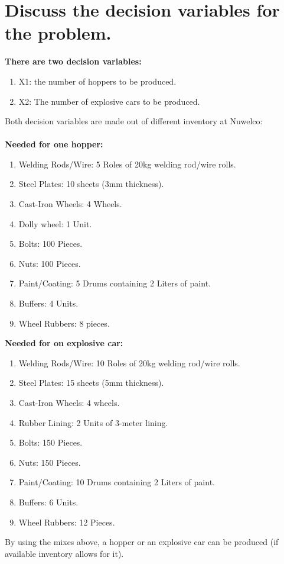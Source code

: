 \documentclass[a4paper,oneside,11pt]{book}
\begin{document}
\section{Discuss the decision variables for the problem.}
\textbf{There are two decision variables:}
\begin{enumerate}
    \item X1: the number of hoppers to be produced.
    \item X2: The number of explosive cars to be produced.
\end{enumerate}
Both decision variables are made out of different inventory at Nuwelco: \\\\
\textbf{Needed for one hopper:}
\begin{enumerate}
    \item Welding Rods/Wire: 5 Roles of 20kg welding rod/wire rolls.
    \item Steel Plates: 10 sheets (3mm thickness).
    \item Cast-Iron Wheels: 4 Wheels.
    \item Dolly wheel: 1 Unit.
    \item Bolts: 100 Pieces.
    \item Nuts: 100 Pieces.
    \item Paint/Coating: 5 Drums containing 2 Liters of paint.
    \item Buffers: 4 Units.
    \item Wheel Rubbers: 8 pieces.
\end{enumerate}
\textbf{Needed for on explosive car:}
\begin{enumerate}
    \item Welding Rods/Wire: 10 Roles of 20kg welding rod/wire rolls.
    \item Steel Plates: 15 sheets (5mm thickness).
    \item Cast-Iron Wheels: 4 wheels.
    \item Rubber Lining: 2 Units of 3-meter lining.
    \item Bolts: 150 Pieces.
    \item Nuts: 150 Pieces.
    \item Paint/Coating: 10 Drums containing 2 Liters of paint.
    \item Buffers: 6 Units.
    \item Wheel Rubbers: 12 Pieces.
\end{enumerate}
By using the mixes above, a hopper or an explosive car can be produced (if available inventory allows for it). 
\end{document}
